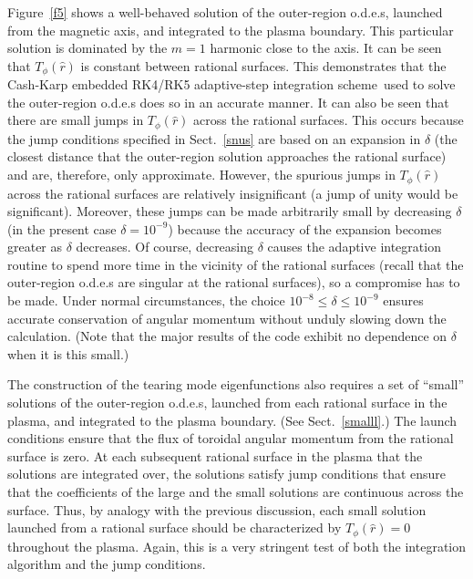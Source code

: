 \documentclass[12pt,prb,aps]{revtex4-1}
\begin{document}
 Figure~\ref{f5} shows a well-behaved 
 solution of the outer-region o.d.e.s, launched from the magnetic axis, and integrated to the plasma boundary. This
 particular solution is dominated by the $m=1$ harmonic close to the axis. It can be seen that $T_\phi(\hat{r})$ is constant between
 rational surfaces. This demonstrates that the Cash-Karp embedded RK4/RK5 adaptive-step integration scheme\,\cite{press} used to solve the outer-region o.d.e.s
 does so in an accurate manner. It can also be seen that there are small jumps in $T_\phi(\hat{r})$ across the rational surfaces. This occurs because the
 jump conditions specified in Sect.~\ref{snus} are based on an expansion in $\delta$ (the closest distance that the outer-region solution approaches the rational
 surface) and are, therefore, only approximate. However, the spurious jumps in $T_\phi(\hat{r})$ across the rational surfaces are 
 relatively insignificant (a jump of unity would be significant). Moreover, these jumps can be made arbitrarily small by
 decreasing $\delta$ (in the present case $\delta=10^{-9}$) because the accuracy of the expansion becomes greater as 
 $\delta$ decreases. Of course, decreasing $\delta$ causes the adaptive integration routine to spend more time in the vicinity of the rational
 surfaces (recall that the outer-region o.d.e.s are singular at the rational surfaces), so a compromise has to be  made. Under normal circumstances, the choice $10^{-8}\leq \delta\leq 10^{-9}$ ensures
 accurate conservation of angular momentum without unduly slowing down the calculation. (Note that the major results of the code
 exhibit no dependence on $\delta$ when it is this small.) 
 
 The construction of the tearing mode eigenfunctions also
 requires a set of ``small'' solutions of the outer-region o.d.e.s, launched from each rational surface in the plasma, and  integrated
 to the plasma boundary. (See Sect.~\ref{smalll}.) The launch conditions ensure that the flux of toroidal angular momentum from the rational surface is zero. 
 At each subsequent rational surface in the plasma that the solutions are integrated over, the solutions  satisfy  jump conditions that ensure that the
 coefficients of the large and the small solutions are continuous across the surface.  Thus, by analogy with the previous discussion, each
 small solution launched from a rational surface should be characterized by $T_\phi(\hat{r})=0$ throughout the plasma. 
 Again, this is a very stringent test of both the integration algorithm and the jump conditions. 
 
\end{document}
